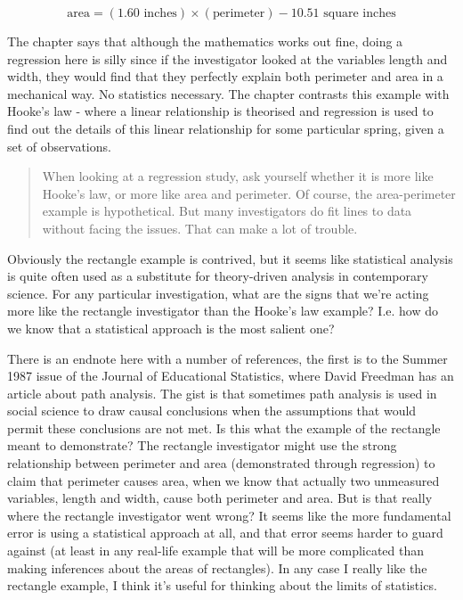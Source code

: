 \documentclass[
]{book}
\begin{document}
\[
\text{area} = (1.60 \text{ inches}) \times (\text{perimeter}) - 10.51 \text{ square inches}
\]

The chapter says that although the mathematics works out fine, doing a regression here is silly since if the investigator looked at the variables length and width, they would find that they perfectly explain both perimeter and area in a mechanical way. No statistics necessary. The chapter contrasts this example with Hooke's law - where a linear relationship is theorised and regression is used to find out the details of this linear relationship for some particular spring, given a set of observations.

\begin{quote}
When looking at a regression study, ask yourself whether it is more like Hooke's law, or more like area and perimeter. Of course, the area-perimeter example is hypothetical. But many investigators do fit lines to data without facing the issues. That can make a lot of trouble.
\end{quote}

Obviously the rectangle example is contrived, but it seems like statistical analysis is quite often used as a substitute for theory-driven analysis in contemporary science. For any particular investigation, what are the signs that we're acting more like the rectangle investigator than the Hooke's law example? I.e. how do we know that a statistical approach is the most salient one?

There is an endnote here with a number of references, the first is to the Summer 1987 issue of the Journal of Educational Statistics, where David Freedman has an article about path analysis. The gist is that sometimes path analysis is used in social science to draw causal conclusions when the assumptions that would permit these conclusions are not met. Is this what the example of the rectangle meant to demonstrate? The rectangle investigator might use the strong relationship between perimeter and area (demonstrated through regression) to claim that perimeter causes area, when we know that actually two unmeasured variables, length and width, cause both perimeter and area. But is that really where the rectangle investigator went wrong? It seems like the more fundamental error is using a statistical approach at all, and that error seems harder to guard against (at least in any real-life example that will be more complicated than making inferences about the areas of rectangles). In any case I really like the rectangle example, I think it's useful for thinking about the limits of statistics.
\end{document}
